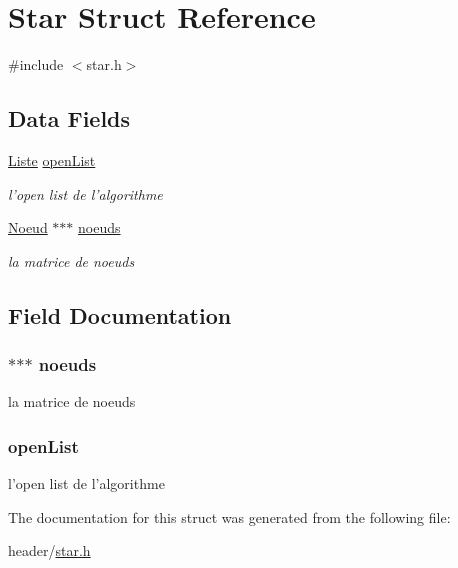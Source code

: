 \hypertarget{struct_star}{\section{Star Struct Reference}
\label{struct_star}
}


{\ttfamily \#include $<$star.\-h$>$}

\subsection*{Data Fields}
\begin{DoxyCompactItemize}
\item 
\hyperlink{struct_liste}{Liste} \hyperlink{struct_star_a68600572a5cf10269c4c8d4d8ea6bf58}{open\-List}
\begin{DoxyCompactList}\small\item\em l'open list de l'algorithme \end{DoxyCompactList}\item 
\hyperlink{struct_noeud}{Noeud} $\ast$$\ast$$\ast$ \hyperlink{struct_star_a3c801090179aaaba8c00204d03c8ae28}{noeuds}
\begin{DoxyCompactList}\small\item\em la matrice de noeuds \end{DoxyCompactList}\end{DoxyCompactItemize}


\subsection{Field Documentation}
\hypertarget{struct_star_a3c801090179aaaba8c00204d03c8ae28}{
\subsubsection[{noeuds}]{$\ast$$\ast$$\ast$ noeuds}}\label{struct_star_a3c801090179aaaba8c00204d03c8ae28}


la matrice de noeuds 

\hypertarget{struct_star_a68600572a5cf10269c4c8d4d8ea6bf58}{
\subsubsection[{open\-List}]{ open\-List}}\label{struct_star_a68600572a5cf10269c4c8d4d8ea6bf58}


l'open list de l'algorithme 



The documentation for this struct was generated from the following file\-:\begin{DoxyCompactItemize}
\item 
header/\hyperlink{star_8h}{star.\-h}\end{DoxyCompactItemize}
